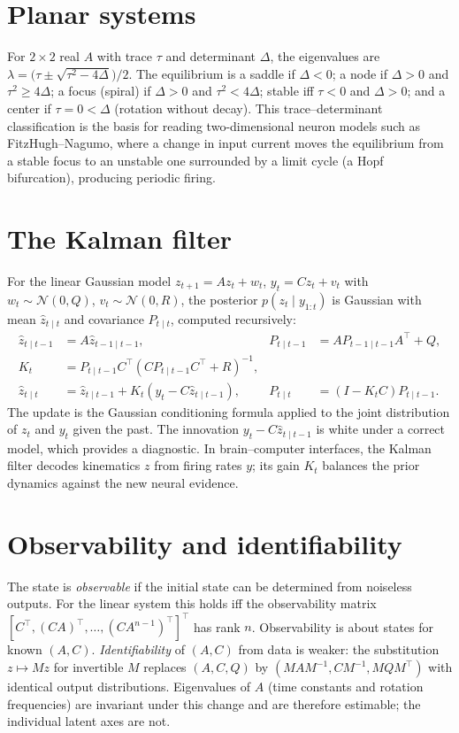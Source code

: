 \section{Planar systems}
For $2\times2$ real $A$ with trace $\tau$ and determinant $\Delta$, the eigenvalues are $\lambda=\bigl(\tau\pm\sqrt{\tau^2-4\Delta}\bigr)/2$. The equilibrium is a saddle if $\Delta<0$; a node if $\Delta>0$ and $\tau^2\ge4\Delta$; a focus (spiral) if $\Delta>0$ and $\tau^2<4\Delta$; stable iff $\tau<0$ and $\Delta>0$; and a center if $\tau=0<\Delta$ (rotation without decay). This trace--determinant classification is the basis for reading two-dimensional neuron models such as FitzHugh--Nagumo, where a change in input current moves the equilibrium from a stable focus to an unstable one surrounded by a limit cycle (a Hopf bifurcation), producing periodic firing.

\section{The Kalman filter}
For the linear Gaussian model $z_{t+1}=Az_t+w_t$, $y_t=Cz_t+v_t$ with $w_t\sim\mathcal N(0,Q)$, $v_t\sim\mathcal N(0,R)$, the posterior $p(z_t\mid y_{1:t})$ is Gaussian with mean $\hat z_{t\mid t}$ and covariance $P_{t\mid t}$, computed recursively:
\[
\begin{aligned}
\hat z_{t\mid t-1}&=A\hat z_{t-1\mid t-1}, & P_{t\mid t-1}&=AP_{t-1\mid t-1}A^\top+Q,\\
K_t&=P_{t\mid t-1}C^\top(CP_{t\mid t-1}C^\top+R)^{-1}, &&\\
\hat z_{t\mid t}&=\hat z_{t\mid t-1}+K_t(y_t-C\hat z_{t\mid t-1}), & P_{t\mid t}&=(I-K_tC)P_{t\mid t-1}.
\end{aligned}
\]
The update is the Gaussian conditioning formula applied to the joint distribution of $z_t$ and $y_t$ given the past. The innovation $y_t-C\hat z_{t\mid t-1}$ is white under a correct model, which provides a diagnostic. In brain--computer interfaces, the Kalman filter decodes kinematics $z$ from firing rates $y$; its gain $K_t$ balances the prior dynamics against the new neural evidence.

\section{Observability and identifiability}
The state is \emph{observable} if the initial state can be determined from noiseless outputs. For the linear system this holds iff the observability matrix $[C^\top,(CA)^\top,\ldots,(CA^{n-1})^\top]^\top$ has rank $n$. Observability is about states for known $(A,C)$. \emph{Identifiability} of $(A,C)$ from data is weaker: the substitution $z\mapsto Mz$ for invertible $M$ replaces $(A,C,Q)$ by $(MAM^{-1},CM^{-1},MQM^\top)$ with identical output distributions. Eigenvalues of $A$ (time constants and rotation frequencies) are invariant under this change and are therefore estimable; the individual latent axes are not.

